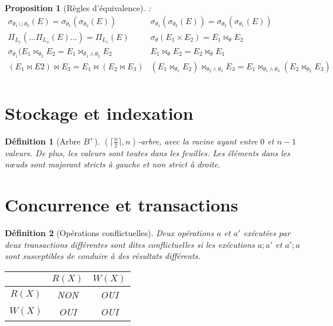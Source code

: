 \documentclass[landscape]{article}
\newcommand{\1}{\mathbbm{1}}
\newcommand{\0}{\mathbbm{0}}
\newtheorem{prop}{Proposition}
\newtheorem{defi}{Définition}
\begin{document}
\begin{multicols}{2}
    \begin{prop}[Règles d'équivalence]:\\
        \[\begin{array}{ccc}
                \sigma_{\theta_1\cup\theta_2}(E) = \sigma_{\theta_1}(\sigma_{\theta_2}(E))
             &  \sigma_{\theta_1}(\sigma_{\theta_2}(E)) = \sigma_{\theta_2}(\sigma_{\theta_1}(E))
             \\ \Pi_{L_1}(\ldots \Pi_{L_n}(E)\ldots  ) = \Pi_{L_1}(E)
             &  \sigma_\theta(E_1\times E_2) = E_1\bowtie_\theta E_2
             \\ \sigma_{\theta_1}(E_1\bowtie_{\theta_2} E_2 = E_1\bowtie_{\theta_1\wedge\theta_2} E_2
             &  E_1\bowtie_\theta E_2 = E_2\bowtie_\theta E_1
             \\ (E_1\bowtie E2)\bowtie E_3 = E_1 \bowtie (E_2\bowtie E_3)
             &  (E_1\bowtie_{\theta_1} E_2)\bowtie_{\theta_2\wedge\theta_3} E_3
                 = E_1 \bowtie_{\theta_1\wedge\theta_3} (E_2\bowtie_{\theta_2} E_3)
             \\
        \end{array}\]
    \end{prop}

    \section{Stockage et indexation}

    \begin{defi}[Arbre $B^+$]
        $(\lceil\frac{n}{2}\rceil,n)$-arbre, avec la racine ayant entre $0$ et $n-1$
        valeurs. De plus, les valeurs sont toutes dans les feuilles. Les éléments dans les
        nœuds sont majorant stricts à gauche et non strict à droite.
    \end{defi}

    \section{Concurrence et transactions}

    \begin{defi}[Opérations conflictuelles]
        Deux opérations $a$ et $a'$ exécutées  par deux transactions différentes
        sont dites conflictuelles si les exécutions $a; a'$ et $a'; a$ sont 
        susceptibles de conduire à des résultats différents.

        \begin{tabular}{|c|c|c|}
            \hline        & $R(X)$ & $W(X)$ \\
            \hline $R(X)$ & NON    & OUI    \\
            \hline $W(X)$ & OUI    & OUI    \\
            \hline
        \end{tabular}
    \end{defi}


\end{multicols}
\end{document}

